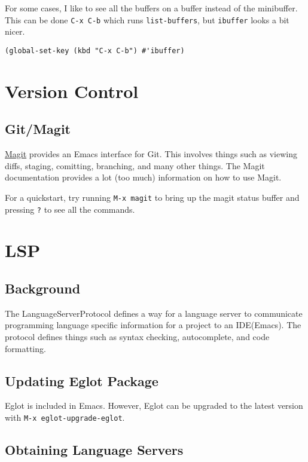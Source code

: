 \documentclass[11pt]{article}
\begin{document}
For some cases, I like to see all the buffers on a buffer instead of the
minibuffer. This can be done \texttt{C-x C-b} which runs \texttt{list-buffers}, but \texttt{ibuffer}
looks a bit nicer.

\begin{verbatim}
(global-set-key (kbd "C-x C-b") #'ibuffer)
\end{verbatim}
\section{Version Control}
\label{sec:orgf56e141}

\subsection{Git/Magit}
\label{sec:org4dec2a0}

\href{https://github.com/magit/magit/tree/e3806cbb7dd38ab73624ad48024998705f9d0d20}{Magit} provides an Emacs interface for Git. This involves things such as viewing
diffs, staging, comitting, branching, and many other things. The Magit
documentation provides a lot (too much) information on how to use Magit.

For a quickstart, try running \texttt{M-x magit} to bring up the magit status buffer
and pressing \texttt{?} to see all the commands.
\section{LSP}
\label{sec:orgb8e1480}

\subsection{Background}
\label{sec:org2a5add3}
The LanguageServerProtocol defines a way for a language server to communicate
programming language specific information for a project to an IDE(Emacs). The
protocol defines things such as syntax checking, autocomplete, and code
formatting.
\subsection{Updating Eglot Package}
\label{sec:org7e1dda4}

Eglot is included in Emacs. However, Eglot can be upgraded to the latest version
with \texttt{M-x eglot-upgrade-eglot}.
\subsection{Obtaining Language Servers}
\label{sec:orge4ca586}
\end{document}
